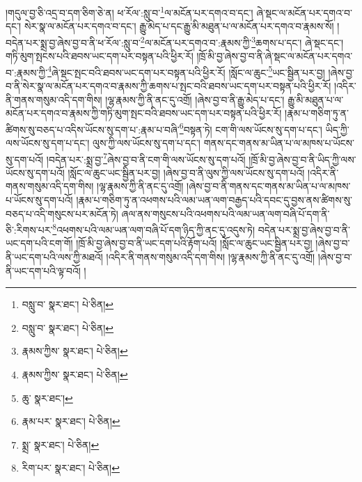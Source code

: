 །གདུལ་བྱ་ཅི་འདྲ་བ་དག་ཅིག་ཅེ་ན། ཕ་རོལ་:སླུ་བ་\footnote{བསླུ་བ་  སྣར་ཐང་།  པེ་ཅིན། }ལ་མངོན་པར་དགའ་བ་དང་། ཞེ་སྡང་ལ་མངོན་པར་དགའ་བ་དང་། སེར་སྣ་ལ་མངོན་པར་དགའ་བ་དང་། རྒྱུ་མེད་པ་དང་རྒྱུ་མི་མཐུན་པ་ལ་མངོན་པར་དགའ་བ་རྣམས་སོ། །བདེན་པར་སྨྲ་བྱ་ཞེས་བྱ་བ་ནི་ཕ་རོལ་:སླུ་བ་\footnote{བསླུ་བ་  སྣར་ཐང་།  པེ་ཅིན། }ལ་མངོན་པར་དགའ་བ་:རྣམས་ཀྱི་\footnote{རྣམས་ཀྱིས་  སྣར་ཐང་།  པེ་ཅིན། }ཆགས་པ་དང་། ཞེ་སྡང་དང་། གཏི་མུག་སྤངས་པའི་ཐབས་ཡང་དག་པར་བསྟན་པའི་ཕྱིར་རོ། །ཁྲོ་མི་བྱ་ཞེས་བྱ་བ་ནི་ཞེ་སྡང་ལ་མངོན་པར་དགའ་བ་:རྣམས་ཀྱི་\footnote{རྣམས་ཀྱིས་  སྣར་ཐང་།  པེ་ཅིན། }ཞེ་སྡང་སྤང་བའི་ཐབས་ཡང་དག་པར་བསྟན་པའི་ཕྱིར་རོ། །སློང་ལ་ཆུང་\footnote{ཆུ་  སྣར་ཐང་། }ཡང་སྦྱིན་པར་བྱ། །ཞེས་བྱ་བ་ནི་སེར་སྣ་ལ་མངོན་པར་དགའ་བ་རྣམས་ཀྱི་ཆགས་པ་སྤང་བའི་ཐབས་ཡང་དག་པར་བསྟན་པའི་ཕྱིར་རོ། །འདིར་ནི་གནས་གསུམ་འདི་དག་གིས། །ལྷ་རྣམས་ཀྱི་ནི་ནང་དུ་འགྲོ། །ཞེས་བྱ་བ་ནི་རྒྱུ་མེད་པ་དང་། རྒྱུ་མི་མཐུན་པ་ལ་མངོན་པར་དགའ་བ་རྣམས་ཀྱི་གཏི་མུག་སྤང་བའི་ཐབས་ཡང་དག་པར་བསྟན་པའི་ཕྱིར་རོ། །རྣམ་པ་གཅིག་ཏུ་ན་ཚིགས་སུ་བཅད་པ་འདིས་ཡོངས་སུ་དག་པ་:རྣམ་པ་བཞི་\footnote{རྣམ་པར་  སྣར་ཐང་།  པེ་ཅིན། }བསྟན་ཏེ། ངག་གི་ལས་ཡོངས་སུ་དག་པ་དང་། ཡིད་ཀྱི་ལས་ཡོངས་སུ་དག་པ་དང་། ལུས་ཀྱི་ལས་ཡོངས་སུ་དག་པ་དང་། གནས་དང་གནས་མ་ཡིན་པ་ལ་མཁས་པ་ཡོངས་སུ་དག་པའོ། །བདེན་པར་:སྨྲ་བྱ་\footnote{སྨྲ་  སྣར་ཐང་།  པེ་ཅིན། }ཞེས་བྱ་བ་ནི་ངག་གི་ལས་ཡོངས་སུ་དག་པའོ། །ཁྲོ་མི་བྱ་ཞེས་བྱ་བ་ནི་ཡིད་ཀྱི་ལས་ཡོངས་སུ་དག་པའོ། །སློང་ལ་ཆུང་ཡང་སྦྱིན་པར་བྱ། །ཞེས་བྱ་བ་ནི་ལུས་ཀྱི་ལས་ཡོངས་སུ་དག་པའོ། །འདིར་ནི་གནས་གསུམ་འདི་དག་གིས། །ལྷ་རྣམས་ཀྱི་ནི་ནང་དུ་འགྲོ། །ཞེས་བྱ་བ་ནི་གནས་དང་གནས་མ་ཡིན་པ་ལ་མཁས་པ་ཡོངས་སུ་དག་པའོ། །རྣམ་པ་གཅིག་ཏུ་ན་འཕགས་པའི་ལམ་ཡན་ལག་བརྒྱད་པའི་དབང་དུ་བྱས་ནས་ཚིགས་སུ་བཅད་པ་འདི་གསུངས་པར་མངོན་ཏེ། ཞལ་ནས་གསུངས་པའི་འཕགས་པའི་ལམ་ཡན་ལག་བཞི་པོ་དག་ནི་ཅི་:རིགས་པར་\footnote{རིག་པར་  སྣར་ཐང་།  པེ་ཅིན། }འཕགས་པའི་ལམ་ཡན་ལག་བཞི་པོ་དག་ཉིད་ཀྱི་ནང་དུ་འདུས་ཏེ། བདེན་པར་སྨྲ་བྱ་ཞེས་བྱ་བ་ནི་ཡང་དག་པའི་ངག་གོ། །ཁྲོ་མི་བྱ་ཞེས་བྱ་བ་ནི་ཡང་དག་པའི་རྟོག་པའོ། །སློང་ལ་ཆུང་ཡང་སྦྱིན་པར་བྱ། །ཞེས་བྱ་བ་ནི་ཡང་དག་པའི་ལས་ཀྱི་མཐའོ། །འདིར་ནི་གནས་གསུམ་འདི་དག་གིས། །ལྷ་རྣམས་ཀྱི་ནི་ནང་དུ་འགྲོ། །ཞེས་བྱ་བ་ནི་ཡང་དག་པའི་ལྟ་བའོ། །

